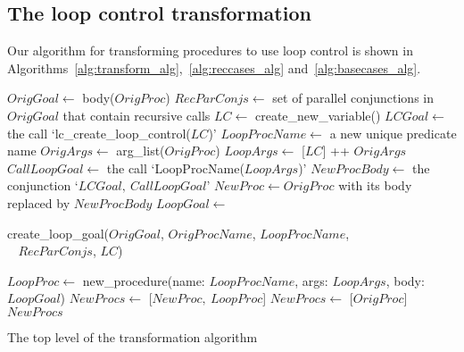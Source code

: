 \subsection{The loop control transformation}
\label{sec:lc_trans}

Our algorithm for transforming procedures to use loop control
is shown in
Algorithms~\ref{alg:transform_alg},~\ref{alg:reccases_alg} and~\ref{alg:basecases_alg}.

\begin{algorithm}[tbp]
\begin{algorithmic}
  \State $OrigGoal \gets$ body($OrigProc$)
  \State $RecParConjs \gets$ set of parallel conjunctions
    in $OrigGoal$ that contain recursive calls
  \BigIf
  \BigIfThen
    \State $LC \gets$ create\_new\_variable()
    \State $LCGoal \gets$ the call
      `lc\_create\_loop\_control($LC$)'
    \State $LoopProcName \gets$ a new unique predicate name
    \State $OrigArgs \gets$ arg\_list($OrigProc$)
    \State $LoopArgs \gets$ [$LC$] ++ $OrigArgs$
    \State $CallLoopGoal \gets$ the call
      `LoopProcName($LoopArgs$)'
    \State $NewProcBody \gets$ the conjunction `$LCGoal,~CallLoopGoal$'
    \State $NewProc \gets OrigProc$ with its body replaced
      by $NewProcBody$
    \State $LoopGoal \gets$ \parbox{0.7\textwidth}{create\_loop\_goal($OrigGoal$,
      $OrigProcName$, $LoopProcName$,\\
        $~~~~RecParConjs$, $LC$)}
    \State $LoopProc \gets$ new\_procedure(name: $LoopProcName$, args:
    $LoopArgs$, body: $LoopGoal$)
    \State $NewProcs \gets$ [$NewProc,~LoopProc$]
  \BigIfElse
    \State $NewProcs \gets$ [$OrigProc$]
  \EndBigIfElse
  \State \Return $NewProcs$
\EndProcedure
\end{algorithmic}
\caption{The top level of the transformation algorithm}
\label{alg:transform_alg}
\end{algorithm}

